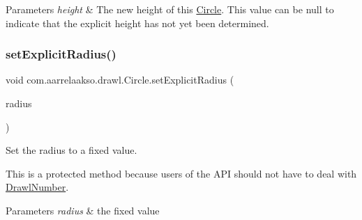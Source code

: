 \begin{DoxyParams}{Parameters}
{\em height} & The new height of this \hyperlink{classcom_1_1aarrelaakso_1_1drawl_1_1_circle}{Circle}. This value can be {\ttfamily null} to indicate that the explicit height has not yet been determined. \\
\hline
\end{DoxyParams}
\mbox{\label{classcom_1_1aarrelaakso_1_1drawl_1_1_circle_ab488257bdd425addecb822c45ed659ba}} 
\subsubsection{\texorpdfstring{set\+Explicit\+Radius()}{setExplicitRadius()}\hspace{0.1cm}{\footnotesize\ttfamily [1/2]}}
{\footnotesize\ttfamily void com.\+aarrelaakso.\+drawl.\+Circle.\+set\+Explicit\+Radius (\begin{DoxyParamCaption}\item[{@Not\+Null \hyperlink{classcom_1_1aarrelaakso_1_1drawl_1_1_drawl_number}{Drawl\+Number}}]{radius }\end{DoxyParamCaption})\hspace{0.3cm}{\ttfamily [protected]}}



Set the radius to a fixed value. 

This is a protected method because users of the A\+PI should not have to deal with \hyperlink{classcom_1_1aarrelaakso_1_1drawl_1_1_drawl_number}{Drawl\+Number}.


\begin{DoxyParams}{Parameters}
{\em radius} & the fixed value \\
\hline
\end{DoxyParams}
\mbox{\label{classcom_1_1aarrelaakso_1_1drawl_1_1_circle_af34a59acf0e1fc33777aca1b9be7b23d}} 

